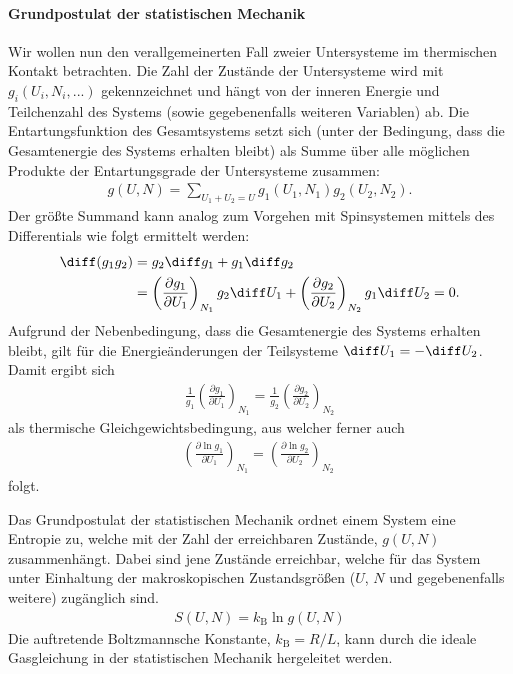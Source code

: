 \paragraph*{Grundpostulat der statistischen Mechanik}
Wir wollen nun den verallgemeinerten Fall zweier Untersysteme im thermischen Kontakt betrachten. Die Zahl der Zustände der Untersysteme wird mit $g_i(U_i,N_i,...)$ gekennzeichnet und hängt von der inneren Energie und Teilchenzahl des Systems (sowie gegebenenfalls weiteren Variablen) ab. Die Entartungsfunktion des Gesamtsystems setzt sich (unter der Bedingung, dass die Gesamtenergie des Systems erhalten bleibt) als Summe über alle möglichen Produkte der Entartungsgrade der Untersysteme zusammen: 
\begin{align*}
    g(U,N)=\sum_{U_1+U_2=U}g_1(U_1,N_1)g_2(U_2,N_2).
\end{align*}
Der größte Summand kann analog zum Vorgehen mit Spinsystemen mittels des Differentials wie folgt ermittelt werden:
\begin{align*}
    \diff(g_1g_2)&=g_2 \diff g_1 +g_1\diff g_2\\
    &=\left(\frac{\partial g_1}{\partial U_1}\right)_{N_1}g_2\diff U_1+\left(\frac{\partial g_2}{\partial U_2}\right)_{N_2}g_1\diff U_2=0.
\end{align*}
Aufgrund der Nebenbedingung, dass die Gesamtenergie des Systems erhalten bleibt, gilt für die Energieänderungen der Teilsysteme $\diff U_1=-\diff U_2$.
Damit ergibt sich 
\begin{align*}
    \frac{1}{g_1}\left(\frac{\partial g_1}{\partial U_1}\right)_{N_1}=\frac{1}{g_2}\left(\frac{\partial g_2}{\partial U_2}\right)_{N_2}
\end{align*}
als thermische Gleichgewichtsbedingung, aus welcher ferner auch
\begin{align*}
    \boxed{\left(\frac{\partial \ln g_1}{\partial U_1}\right)_{N_1}=\left(\frac{\partial \ln g_2}{\partial U_2}\right)_{N_2}}\:
\end{align*}
folgt.
\begin{postulate}
    \label{post:GrundpostulatStatMech}
     Das Grundpostulat der statistischen Mechanik ordnet einem System eine Entropie zu, welche mit der Zahl der erreichbaren Zustände, $g(U,N)$ zusammenhängt. Dabei sind jene Zustände erreichbar, welche für das System unter Einhaltung der makroskopischen Zustandsgrößen ($U$, $N$ und gegebenenfalls weitere) zugänglich sind.
    \begin{align*}
        \boxed{S(U,N)=k_\mathrm{B}\ln g(U,N)}
    \end{align*}
    Die auftretende Boltzmannsche Konstante, $k_\mathrm{B}=R/L$, kann durch die ideale Gasgleichung in der statistischen Mechanik hergeleitet werden.
\end{postulate}

